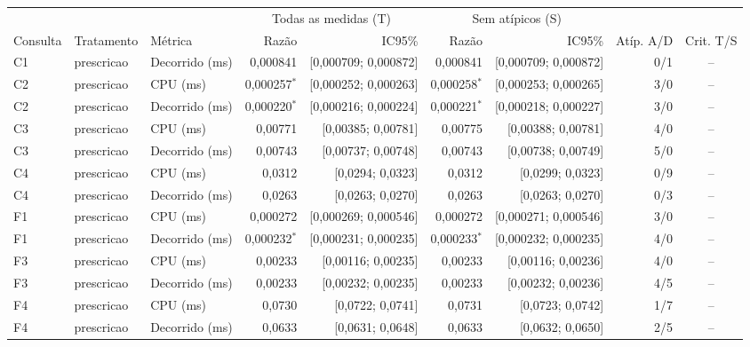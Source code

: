 {\scriptsize\setlength{\tabcolsep}{4pt}
\begin{tabular}{lllrrrrrc}
\toprule
 &  &  & \multicolumn{2}{c}{Todas as medidas (T)} & \multicolumn{2}{c}{Sem atípicos (S)} &  &  \\
\cmidrule(lr){4-5}\cmidrule(lr){6-7}
Consulta & Tratamento & Métrica & Razão & IC95\% & Razão & IC95\% & Atíp. A/D & Crit. T/S \\
\midrule
C1 & prescricao & Decorrido (ms) & 0,000841 & [0,000709; 0,000872] & 0,000841 & [0,000709; 0,000872] & 0/1 & -- \\
C2 & prescricao & CPU (ms) & 0,000257$^{*}$ & [0,000252; 0,000263] & 0,000258$^{*}$ & [0,000253; 0,000265] & 3/0 & -- \\
C2 & prescricao & Decorrido (ms) & 0,000220$^{*}$ & [0,000216; 0,000224] & 0,000221$^{*}$ & [0,000218; 0,000227] & 3/0 & -- \\
C3 & prescricao & CPU (ms) & 0,00771 & [0,00385; 0,00781] & 0,00775 & [0,00388; 0,00781] & 4/0 & -- \\
C3 & prescricao & Decorrido (ms) & 0,00743 & [0,00737; 0,00748] & 0,00743 & [0,00738; 0,00749] & 5/0 & -- \\
C4 & prescricao & CPU (ms) & 0,0312 & [0,0294; 0,0323] & 0,0312 & [0,0299; 0,0323] & 0/9 & -- \\
C4 & prescricao & Decorrido (ms) & 0,0263 & [0,0263; 0,0270] & 0,0263 & [0,0263; 0,0270] & 0/3 & -- \\
F1 & prescricao & CPU (ms) & 0,000272 & [0,000269; 0,000546] & 0,000272 & [0,000271; 0,000546] & 3/0 & -- \\
F1 & prescricao & Decorrido (ms) & 0,000232$^{*}$ & [0,000231; 0,000235] & 0,000233$^{*}$ & [0,000232; 0,000235] & 4/0 & -- \\
F3 & prescricao & CPU (ms) & 0,00233 & [0,00116; 0,00235] & 0,00233 & [0,00116; 0,00236] & 4/0 & -- \\
F3 & prescricao & Decorrido (ms) & 0,00233 & [0,00232; 0,00235] & 0,00233 & [0,00232; 0,00236] & 4/5 & -- \\
F4 & prescricao & CPU (ms) & 0,0730 & [0,0722; 0,0741] & 0,0731 & [0,0723; 0,0742] & 1/7 & -- \\
F4 & prescricao & Decorrido (ms) & 0,0633 & [0,0631; 0,0648] & 0,0633 & [0,0632; 0,0650] & 2/5 & -- \\

\end{tabular}}
